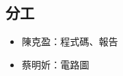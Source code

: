 \documentclass[10.5pt,compsoc,UTF8]{CjC}
\theoremstyle{mystyle}
\begin{document}
\subsection*{分工}
\begin{itemize}
  \item 陳克盈：程式碼、報告
  \item 蔡明妡：電路圖
\end{itemize}
\end{document}
